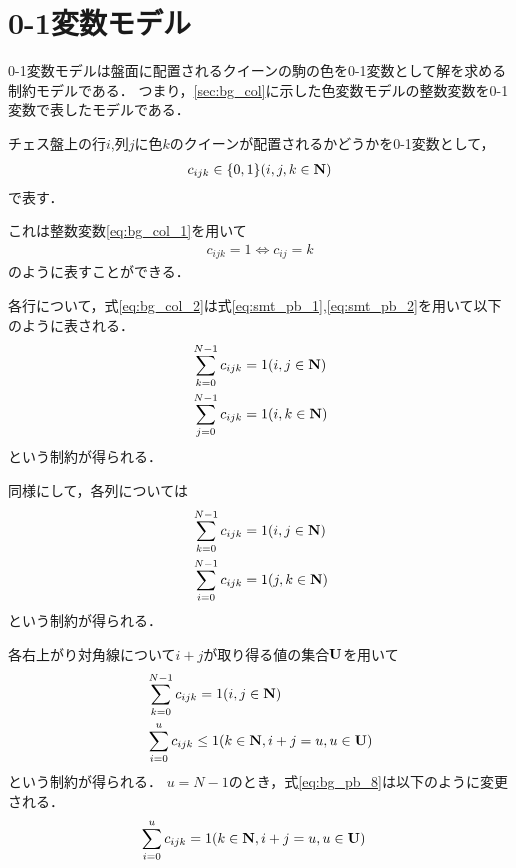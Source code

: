 \section{0-1変数モデル}\label{sec:bg_pb}
0-1変数モデルは盤面に配置されるクイーンの駒の色を0-1変数として解を求める制約モデルである．
つまり，\ref{sec:bg_col}に示した色変数モデルの整数変数を0-1変数で表したモデルである．

チェス盤上の行$i$,列$j$に色$k$のクイーンが配置されるかどうかを0-1変数として，
\begin{eqnarray}
    c_{ijk} \in \{0,1\} (i,j,k \in {\bf N}) \label{eq:bg_pb_1}
\end{eqnarray}
で表す．

これは整数変数\ref{eq:bg_col_1}を用いて
\begin{eqnarray}
    c_{ijk}=1 \Leftrightarrow c_{ij}=k \label{eq:bg_pb_2}
 \end{eqnarray}
のように表すことができる．

各行について，式\ref{eq:bg_col_2}は式\ref{eq:smt_pb_1},\ref{eq:smt_pb_2}を用いて以下のように表される．
\begin{eqnarray}
    & \sum_{k=0}^{N-1} c_{ijk} = 1     (i,j \in {\bf N}) \label{eq:bg_pb_3}\\
    & \sum_{j=0}^{N-1} c_{ijk} = 1     (i,k \in {\bf N}) \label{eq:bg_pb_4}
\end{eqnarray}
という制約が得られる．

同様にして，各列については
\begin{eqnarray}
    & \sum_{k=0}^{N-1} c_{ijk} = 1     (i,j \in {\bf N}) \label{eq:bg_pb_5}\\
    & \sum_{i=0}^{N-1} c_{ijk} = 1     (j,k \in {\bf N}) \label{eq:bg_pb_6}
\end{eqnarray}
という制約が得られる．

各右上がり対角線について$i+j$が取り得る値の集合$\bf U$を用いて
\begin{eqnarray}
    & \sum_{k=0}^{N-1} c_{ijk} = 1     (i,j \in {\bf N})    \label{eq:bg_pb_7}\\
    & \sum_{i=0}^{u} c_{ijk} \leq 1  (k \in {\bf N}, i+j=u, u \in {\bf U}) \label{eq:bg_pb_8}
\end{eqnarray}
という制約が得られる．
$u=N-1$のとき，式\ref{eq:bg_pb_8}は以下のように変更される．
\begin{eqnarray}
    & \sum_{i=0}^{u} c_{ijk} = 1  (k \in {\bf N}, i+j=u, u \in {\bf U}) \label{eq:bg_pb_9}
\end{eqnarray}


